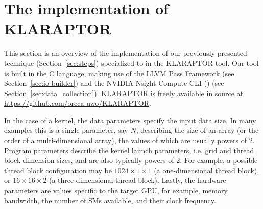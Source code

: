 \chapter{The implementation of KLARAPTOR}
\label{ch:implementation}


This section is an overview of the implementation of
our previously presented technique (Section~\ref{sec:steps})
specialized to {\cuda} in the KLARAPTOR tool.
Our tool is built in the C language, 
making use of the LLVM Pass Framework (see Section~\ref{sec:io-builder}) 
and the NVIDIA Nsight Compute CLI (\ncu) (see Section~\ref{sec:data_collection}).
KLARAPTOR is freely available in source at 
\textcolor{navy}{\href{https://github.com/orcca-uwo/KLARAPTOR}{https://github.com/orcca-uwo/KLARAPTOR}}.

In the case of a {\cuda} kernel, the data parameters
specify the input data size.
In many examples this is a single parameter, say $N$,
describing the size of an array (or the order of a multi-dimensional array), 
the values of which are usually powers of $2$.
Program parameters describe
the kernel launch parameters, i.e. grid and thread block dimension sizes, 
and are also typically powers of $2$.
For example, a possible thread block configuration
may be $1024 \times 1 \times 1$ (a one-dimensional thread block),
or $16 \times 16 \times 2$ (a three-dimensional thread block).
Lastly, the hardware parameters are values specific to the 
target GPU, for example, memory bandwidth, the number of SMs available,
and their clock frequency.

